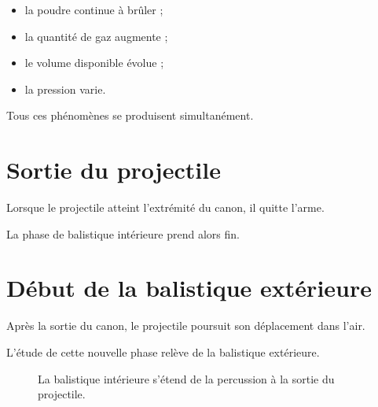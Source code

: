 \begin{itemize}
    \item la poudre continue à brûler ;
    \item la quantité de gaz augmente ;
    \item le volume disponible évolue ;
    \item la pression varie.
\end{itemize}

Tous ces phénomènes se produisent simultanément.

\section{Sortie du projectile}

Lorsque le projectile atteint l'extrémité du canon, il quitte l'arme.

La phase de balistique intérieure prend alors fin.

\section{Début de la balistique extérieure}

Après la sortie du canon, le projectile poursuit son déplacement dans l'air.

L'étude de cette nouvelle phase relève de la balistique extérieure.

\begin{figure}[htbp]
\centering


\caption{La balistique intérieure s'étend de la percussion à la sortie du projectile.}
\label{fig:limites_balistique_interieure}

\end{figure}

